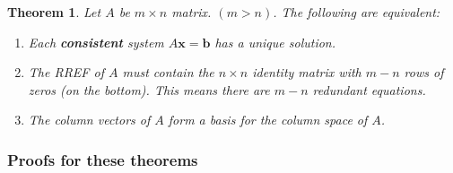 \documentclass[12pt]{article}
\theoremstyle{plain}
\newtheorem{theorem}{Theorem}[section]
\theoremstyle{remark}
\theoremstyle{definition}
\begin{document}
\begin{theorem}
Let \(A\) be \(m \times n\) matrix. \((m > n)\). The
following are equivalent:

\begin{enumerate}
\def\labelenumi{\arabic{enumi}.}
\item
  Each \textbf{consistent} system \(A\mathbf{x} = \mathbf{b}\)
  has a unique solution.
\item
  The RREF of \(A\) must contain the \(n \times n\) identity matrix with
  \(m - n\) rows of zeros (on the bottom). This means there are
  \(m - n\) redundant equations.
\item
  The column vectors of \(A\) form a basis for the column space of
  \(A\).
\end{enumerate}
\end{theorem}


\subsubsection{Proofs for these
theorems}
\end{document}
